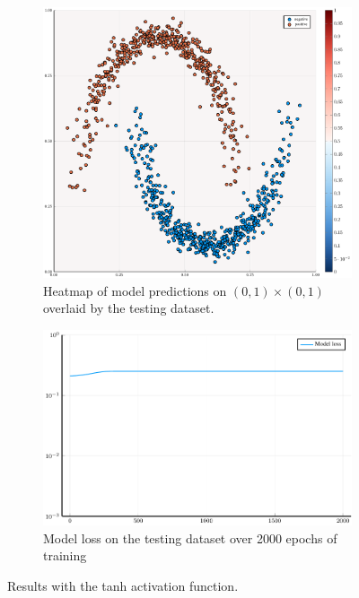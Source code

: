 \begin{figure}
	\centering
	\begin{subfigure}{0.49\textwidth}
		\centering
		\includegraphics[width=\textwidth]{images/tanh-heatmap/tanh.pdf}
		\caption{Heatmap of model predictions on \( \left( 0, 1 \right) \times \left( 0, 1 \right) \) overlaid by the testing dataset.}
	\end{subfigure}
	\begin{subfigure}{0.49\textwidth}
		\centering
		\includegraphics[width=\textwidth]{images/tanh-modelloss/tanh.pdf}
		\caption{Model loss on the testing dataset over 2000 epochs of training}
	\end{subfigure}
	\caption{Results with the tanh activation function.}\label{tanh}
\end{figure}

